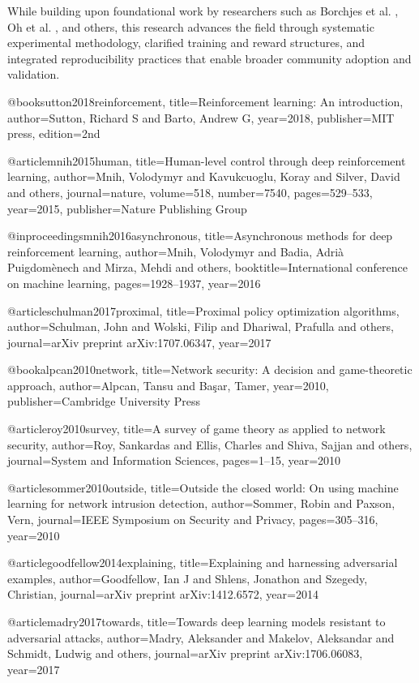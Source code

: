 While building upon foundational work by researchers such as Borchjes et al. \citep{borchjes2023adversarial}, Oh et al. \citep{oh2023applying,oh2024employing}, and others, this research advances the field through systematic experimental methodology, clarified training and reward structures, and integrated reproducibility practices that enable broader community adoption and validation.


@book{sutton2018reinforcement,
  title={Reinforcement learning: An introduction},
  author={Sutton, Richard S and Barto, Andrew G},
  year={2018},
  publisher={MIT press},
  edition={2nd}
}

@article{mnih2015human,
  title={Human-level control through deep reinforcement learning},
  author={Mnih, Volodymyr and Kavukcuoglu, Koray and Silver, David and others},
  journal={nature},
  volume={518},
  number={7540},
  pages={529--533},
  year={2015},
  publisher={Nature Publishing Group}
}

@inproceedings{mnih2016asynchronous,
  title={Asynchronous methods for deep reinforcement learning},
  author={Mnih, Volodymyr and Badia, Adri{\`a} Puigdom{\`e}nech and Mirza, Mehdi and others},
  booktitle={International conference on machine learning},
  pages={1928--1937},
  year={2016}
}

@article{schulman2017proximal,
  title={Proximal policy optimization algorithms},
  author={Schulman, John and Wolski, Filip and Dhariwal, Prafulla and others},
  journal={arXiv preprint arXiv:1707.06347},
  year={2017}
}

@book{alpcan2010network,
  title={Network security: A decision and game-theoretic approach},
  author={Alpcan, Tansu and Ba{\c{s}}ar, Tamer},
  year={2010},
  publisher={Cambridge University Press}
}

@article{roy2010survey,
  title={A survey of game theory as applied to network security},
  author={Roy, Sankardas and Ellis, Charles and Shiva, Sajjan and others},
  journal={System and Information Sciences},
  pages={1--15},
  year={2010}
}

@article{sommer2010outside,
  title={Outside the closed world: On using machine learning for network intrusion detection},
  author={Sommer, Robin and Paxson, Vern},
  journal={IEEE Symposium on Security and Privacy},
  pages={305--316},
  year={2010}
}

@article{goodfellow2014explaining,
  title={Explaining and harnessing adversarial examples},
  author={Goodfellow, Ian J and Shlens, Jonathon and Szegedy, Christian},
  journal={arXiv preprint arXiv:1412.6572},
  year={2014}
}

@article{madry2017towards,
  title={Towards deep learning models resistant to adversarial attacks},
  author={Madry, Aleksander and Makelov, Aleksandar and Schmidt, Ludwig and others},
  journal={arXiv preprint arXiv:1706.06083},
  year={2017}
}

